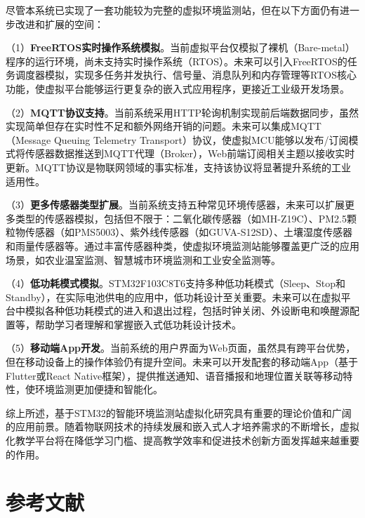 \documentclass[12pt,a4paper]{ctexart}
\begin{document}
尽管本系统已实现了一套功能较为完整的虚拟环境监测站，但在以下方面仍有进一步改进和扩展的空间：

（1）\textbf{FreeRTOS实时操作系统模拟}。当前虚拟平台仅模拟了裸机（Bare-metal）程序的运行环境，尚未支持实时操作系统（RTOS）。未来可以引入FreeRTOS的任务调度器模拟，实现多任务并发执行、信号量、消息队列和内存管理等RTOS核心功能，使虚拟平台能够运行更复杂的嵌入式应用程序，更接近工业级开发场景。

（2）\textbf{MQTT协议支持}。当前系统采用HTTP轮询机制实现前后端数据同步，虽然实现简单但存在实时性不足和额外网络开销的问题。未来可以集成MQTT（Message Queuing Telemetry Transport）协议，使虚拟MCU能够以发布/订阅模式将传感器数据推送到MQTT代理（Broker），Web前端订阅相关主题以接收实时更新。MQTT协议是物联网领域的事实标准，支持该协议将显著提升系统的工业适用性。

（3）\textbf{更多传感器类型扩展}。当前系统支持五种常见环境传感器，未来可以扩展更多类型的传感器模拟，包括但不限于：二氧化碳传感器（如MH-Z19C）、PM2.5颗粒物传感器（如PMS5003）、紫外线传感器（如GUVA-S12SD）、土壤湿度传感器和雨量传感器等。通过丰富传感器种类，使虚拟环境监测站能够覆盖更广泛的应用场景，如农业温室监测、智慧城市环境监测和工业安全监测等。

（4）\textbf{低功耗模式模拟}。STM32F103C8T6支持多种低功耗模式（Sleep、Stop和Standby），在实际电池供电的应用中，低功耗设计至关重要。未来可以在虚拟平台中模拟各种低功耗模式的进入和退出过程，包括时钟关闭、外设断电和唤醒源配置等，帮助学习者理解和掌握嵌入式低功耗设计技术。

（5）\textbf{移动端App开发}。当前系统的用户界面为Web页面，虽然具有跨平台优势，但在移动设备上的操作体验仍有提升空间。未来可以开发配套的移动端App（基于Flutter或React Native框架），提供推送通知、语音播报和地理位置关联等移动特性，使环境监测更加便捷和智能化。

综上所述，基于STM32的智能环境监测站虚拟化研究具有重要的理论价值和广阔的应用前景。随着物联网技术的持续发展和嵌入式人才培养需求的不断增长，虚拟化教学平台将在降低学习门槛、提高教学效率和促进技术创新方面发挥越来越重要的作用。

\newpage
\section*{参考文献}
\end{document}
